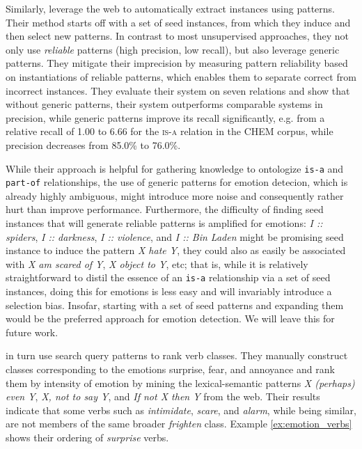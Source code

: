 Similarly, \citeauthor{harvesting_ontologizing} leverage the web to automatically extract instances using patterns. Their method starts off with a set of seed instances, from which they induce and then select new patterns. In contrast to most unsupervised approaches, they not only use \emph{reliable} patterns (high precision, low recall), but also leverage generic patterns. They mitigate their imprecision by measuring pattern reliability based on instantiations of reliable patterns, which enables them to separate correct from incorrect instances. They evaluate their system on seven relations and show that without generic patterns, their system outperforms comparable systems in precision, while generic patterns improve its recall significantly, e.g. from a relative recall of 1.00 to 6.66 for the \textsc{is-a} relation in the CHEM corpus, while precision decreases from 85.0\% to 76.0\%.

While their approach is helpful for gathering knowledge to ontologize \texttt{is-a} and \texttt{part-of} relationships, the use of generic patterns for emotion detecion, which is already highly ambiguous, might introduce more noise and consequently rather hurt than improve performance. Furthermore, the difficulty of finding seed instances that will generate reliable patterns is amplified for emotions: \textit{I :: spiders}, \textit{I :: darkness},  \textit{I :: violence}, and \textit{I :: Bin Laden} might be promising seed instance to induce the pattern \textit{X hate Y}, they could also as easily be associated with \textit{X am scared of Y}, \textit{X object to Y}, etc; that is, while it is relatively straightforward to distil the essence of an \texttt{is-a} relationship via a set of seed instances, doing this for emotions is less easy and will invariably introduce a selection bias. Insofar, starting with a set of seed patterns and expanding them would be the preferred approach for emotion detection. We will leave this for future work.

\citeauthor{emotion_verbs} in turn use search query patterns to rank verb classes. They manually construct classes corresponding to the emotions surprise, fear, and annoyance and rank them by intensity of emotion by mining the lexical-semantic patterns \textit{X (perhaps) even Y}, \textit{X, not to say Y}, and \textit{If not X then Y} from the web. Their results indicate that some verbs such as \textit{intimidate}, \textit{scare}, and \textit{alarm}, while being similar, are not members of the same broader \textit{frighten} class. Example \ref{ex:emotion_verbs} shows their ordering of \textit{surprise} verbs.

